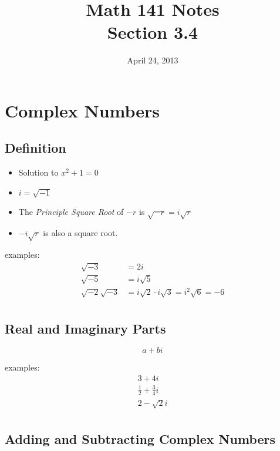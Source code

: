 \documentclass{exam}
\title{Math 141 Notes \\ Section 3.4}
\date{April 24, 2013}
\begin{document}
  \maketitle
  \tableofcontents

  \section{Complex Numbers}

  \subsection{Definition}
  \begin{itemize}
    \item Solution to $x^2 + 1 = 0$

    \item $i = \sqrt{-1}$
      
    \item The {\em Principle Square Root} of $-r$ is $\sqrt{-r} = i \sqrt{r}$

    \item $-i \sqrt{r}$ is also a square root.

  \end{itemize}

  examples:
  \begin{align*}
    \sqrt{-3} &= 2i \\
    \sqrt{-5} &= i \sqrt{5} \\
    \sqrt{-2} \sqrt{-3} &= i \sqrt{2} \cdot i \sqrt{3} = i^2 \sqrt{6} = -6 \\
  \end{align*}

  \subsection{Real and Imaginary Parts}

  \[
    a + bi
  \]

  examples:
  \begin{align*}
    3 + 4i \\
    \frac{1}{2} + \frac{3}{4}i \\
    2 - \sqrt{2}i \\
  \end{align*}

  \subsection{Adding and Subtracting Complex Numbers}
\end{document}
